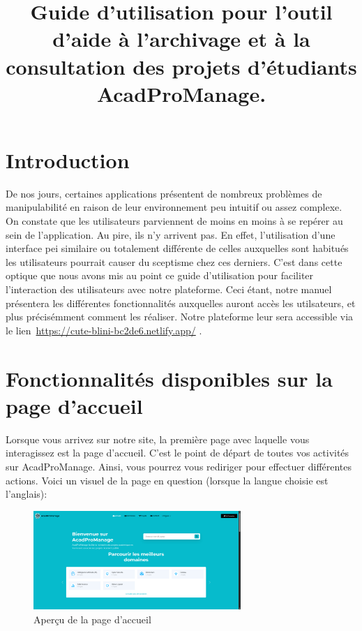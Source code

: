 \documentclass[12pt]{article}
\title{Guide d'utilisation pour l'outil d’aide à l’archivage et à la consultation des projets d'étudiants AcadProManage.}
\begin{document}
\date{}

\maketitle
\clearpage

\tableofcontents
\clearpage

\listoffigures
\clearpage


\vfill
\newpage

{\fontsize{14}{16}\section*{Introduction}}
De nos jours, certaines applications présentent de nombreux problèmes de manipulabilité en raison de leur environnement peu intuitif ou assez complexe. On constate que les utilisateurs parviennent de moins en moins à se repérer au sein de l'application. Au pire, ils n'y arrivent pas. En effet, l'utilisation d'une interface pei similaire ou totalement différente de celles auxquelles sont habitués les utilisateurs pourrait causer du sceptisme chez ces derniers. C'est dans cette optique que nous avons mis au point ce guide d'utilisation pour faciliter l'interaction des utilisateurs avec notre plateforme. Ceci étant, notre manuel présentera les différentes fonctionnalités auxquelles auront accès les utilsateurs, et plus précisémment comment les réaliser. Notre plateforme leur sera accessible via le lien\, 
\url {https://cute-blini-bc2de6.netlify.app/} .
\setcounter{section}{0}
\newpage

\section{Fonctionnalités disponibles sur la page d'accueil}
Lorsque vous arrivez sur notre site, la première page avec laquelle vous interagissez est la page d'accueil. C'est le point de départ de toutes vos activités sur AcadProManage. Ainsi, vous pourrez vous rediriger pour effectuer différentes actions. Voici un visuel de la page en question (lorsque la langue choisie est l'anglais):
\smallskip
\begin{figure}[h!] 
    \centering
    \includegraphics[width=0.7\textwidth]{./images/Accueil.png}
    \caption{Aperçu de la page d’accueil}
    \label{fig:Accueil}
\end{figure}
\end{document}
